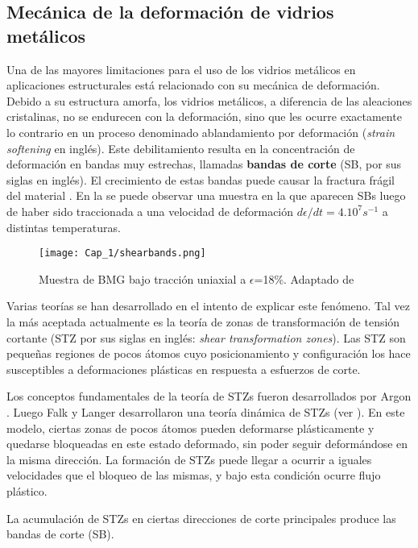 \subsection{Mecánica de la deformación de vidrios metálicos}
\label{S1_1_3}

Una de las mayores limitaciones para el uso de los vidrios metálicos en aplicaciones estructurales está relacionado con su mecánica de deformación. Debido a su estructura amorfa, los vidrios metálicos, a diferencia de las aleaciones cristalinas, no se endurecen con la deformación, sino que les ocurre exactamente lo contrario en un proceso denominado ablandamiento por deformación (\textit{strain softening} en inglés). Este debilitamiento resulta en la concentración de deformación en bandas muy estrechas, llamadas \textbf{bandas de corte} (SB, por sus siglas en inglés). El crecimiento de estas bandas puede causar la fractura frágil del material \citep{schuh07}. En la  se puede observar una muestra en la que aparecen SBs luego de haber sido traccionada a una velocidad de deformación $d\epsilon/dt=4.10^7s^{-1}$ a distintas temperaturas.

\begin{figure}[H]
 \centering
 \texttt{[image: Cap\_1/shearbands.png]}
 \caption[Shear Bands]{Muestra de BMG bajo tracción uniaxial a $\epsilon$=18\%. Adaptado de \cite{albe13}}
 \label{C1:fg:shearbands}
\end{figure}

Varias teorías se han desarrollado en el intento de explicar este fenómeno. Tal vez la más aceptada actualmente es la teoría de zonas de transformación de tensión cortante (STZ por sus siglas en inglés: \textit{shear transformation zones}). Las STZ son pequeñas regiones de pocos átomos cuyo posicionamiento y configuración los hace susceptibles a deformaciones plásticas en respuesta a esfuerzos de corte.

Los conceptos fundamentales de la teoría de STZs fueron desarrollados por Argon \citep{argon79}. Luego Falk y Langer \citep{Falk98, Langer07} desarrollaron una teoría dinámica de STZs (ver ). En este modelo, ciertas zonas de pocos átomos pueden deformarse plásticamente y quedarse bloqueadas en este estado deformado, sin poder seguir deformándose en la misma dirección. La formación de STZs puede llegar a ocurrir a iguales velocidades que el bloqueo de las mismas, y bajo esta condición ocurre flujo plástico.

La acumulación de STZs en ciertas direcciones de corte principales produce las bandas de corte (SB).

